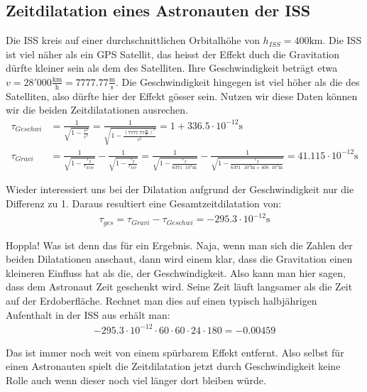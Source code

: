 \begin{refsection}
\subsection{Zeitdilatation eines Astronauten der ISS}
Die ISS kreis auf einer durchschnittlichen Orbitalhöhe von \( h_{ISS} = 400\text{km} \). Die ISS ist viel näher als ein GPS Satellit, das heisst der Effekt duch die Gravitation dürfte kleiner sein als dem des Satelliten. Ihre Geschwindigkeit beträgt etwa \( v = 28'000\frac{\text{km}}{\text{h}} = 7777.77\frac{\text{m}}{\text{s}} \). Die Geschwindigkeit hingegen ist viel höher als die des Satelliten, also dürfte hier der Effekt gösser sein. Nutzen wir diese Daten können wir die beiden Zeitdilatationen ausrechen.
\begin{align*}
\tau_{Geschwi} &=  \frac{1}{\sqrt{1 - \frac{v^2}{c^2}}} = \frac{1}{\sqrt{1 - \frac{( 7777.77\frac{\text{m}}{\text{s}})^2}{c^2}}} = 1 + 336.5 \cdot 10^{-12}\text{s}
\\
\tau_{Gravi} &= \frac{1}{\sqrt{1-\frac{r_g}{r_{Erde}}}} - \frac{1}{\sqrt{1-\frac{r_g}{r_{ISS}}}} 
= \frac{1}{\sqrt{1-\frac{r_g}{6371 \cdot 10^3\text{m}}}} - \frac{1}{\sqrt{1-\frac{r_g}{6371 \cdot 10^3\text{m} + 400 \cdot 10^3\text{m}}}} = 41.115 \cdot 10^{-12}\text{s}
\end{align*}

\noindent{}Wieder interessiert uns bei der Dilatation aufgrund der Geschwindigkeit nur die Differenz zu 1. Daraus resultiert eine Gesamtzeitdilatation von:
\begin{align*}
\tau_{ges} = \tau_{Gravi} - \tau_{Geschwi} = -295.3 \cdot 10^{-12}\text{s}
\end{align*}

\noindent{}Hoppla! Was ist denn das für ein Ergebnis. Naja, wenn man sich die Zahlen der beiden Dilatationen anschaut, dann wird einem klar, dass die Gravitation einen kleineren Einfluss hat als die, der Geschwindigkeit. Also kann man hier sagen, dass dem Astronaut Zeit geschenkt wird. Seine Zeit läuft langsamer als die Zeit auf der Erdoberfläche. Rechnet man dies auf einen typisch halbjährigen Aufenthalt in der ISS aus erhält man:
\begin{align*}
-295.3 \cdot 10^{-12} \cdot 60 \cdot 60 \cdot 24 \cdot 180 = -0.00459
\end{align*}

\noindent{}Das ist immer noch weit von einem spürbarem Effekt entfernt. Also selbst für einen Astronauten spielt die Zeitdilatation jetzt durch Geschwindigkeit keine Rolle auch wenn dieser noch viel länger dort bleiben würde.


\end{refsection}
